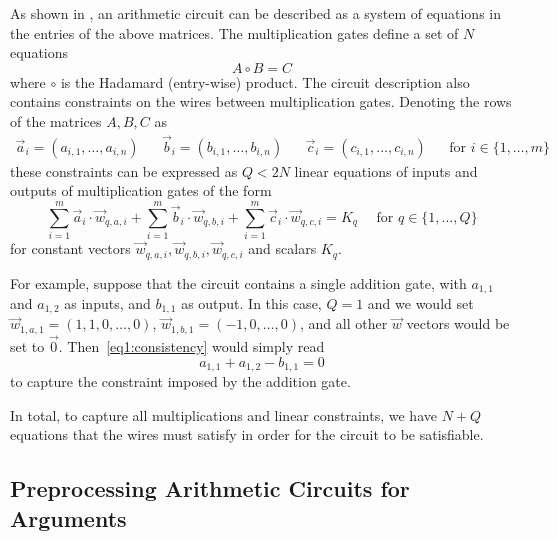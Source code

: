 As shown in \cite{BootleCCGP16}, an arithmetic circuit can be described as a system of equations in the entries of the above matrices. The multiplication gates define a set of $N$ equations 
\begin{equation}\label{eq1:product}
A \circ B = C
\end{equation}
where $\circ$ is the Hadamard (entry-wise) product. 
%
The circuit description also contains constraints on the wires between multiplication gates. %
Denoting the rows of the matrices $A,B,C$ as
\begin{align*}\vec{a}_ {i}=(a_{i,1},\ldots,a_{i,n})&& \vec{b}_ {i}=(b_{i,1},\ldots,b_{i,n})&&\vec{c}_ {i}=(c_{i,1},\ldots,c_{i,n})&& \text{for }  i \in \{1,\ldots,m\}\end{align*}
these constraints can be expressed as $Q<2N$ linear equations of inputs and outputs of multiplication gates of the form
\begin{equation}\label{eq1:consistency}
\sum_{i=1}^m \vec{a}_{i} \cdot \vec{w}_{q,{a,i}}+\sum_{i=1}^m \vec{b}_{i} \cdot \vec{w}_{q,{b,i}}+\sum_{i=1}^m \vec{c}_{i} \cdot  \vec{w}_{q,{c,i}}=K_{q} \quad \text{ for } q \in\{1,\ldots,Q\}
\end{equation}
for constant vectors $\vec{w}_{q,{a,i}},\vec{w}_{q,{b,i}},\vec{w}_{q,{c,i}}$ and scalars $K_{q}$.

For example, suppose that the circuit contains a single addition gate, with $a_{1,1}$ and $a_{1,2}$ as inputs, and $b_{1,1}$ as output. In this case, $Q=1$ and we would set $\vec{w}_{1,a,1} = (1,1,0,\ldots,0)$, $\vec{w}_{1,b,1} = (-1,0,\ldots,0)$, and all other $\vec{w}$ vectors would be set to $\vec{0}$. Then~\eqref{eq1:consistency} would simply read
$$ a_{1,1} + a_{1,2} - b_{1,1} = 0$$
to capture the constraint imposed by the addition gate.

In total, to capture all multiplications and linear constraints, we have $N+Q$ equations that the wires must satisfy in order for the circuit to be satisfiable. %

\subsection{Preprocessing Arithmetic Circuits for Arguments}\label{sec:preprocAC}

